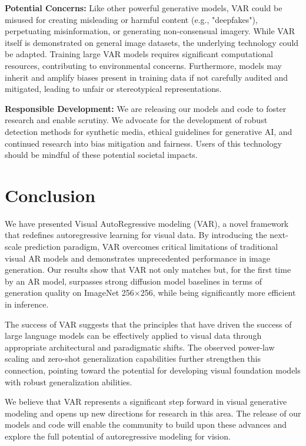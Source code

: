 \documentclass{article}
\begin{document}
\textbf{Potential Concerns:} Like other powerful generative models, VAR could be misused for creating misleading or harmful content (e.g., "deepfakes"), perpetuating misinformation, or generating non-consensual imagery. While VAR itself is demonstrated on general image datasets, the underlying technology could be adapted. Training large VAR models requires significant computational resources, contributing to environmental concerns. Furthermore, models may inherit and amplify biases present in training data if not carefully audited and mitigated, leading to unfair or stereotypical representations.

\textbf{Responsible Development:} We are releasing our models and code to foster research and enable scrutiny. We advocate for the development of robust detection methods for synthetic media, ethical guidelines for generative AI, and continued research into bias mitigation and fairness. Users of this technology should be mindful of these potential societal impacts.

\section{Conclusion}
\label{sec:conclusion}

We have presented Visual AutoRegressive modeling (VAR), a novel framework that redefines autoregressive learning for visual data. By introducing the next-scale prediction paradigm, VAR overcomes critical limitations of traditional visual AR models and demonstrates unprecedented performance in image generation. Our results show that VAR not only matches but, for the first time by an AR model, surpasses strong diffusion model baselines in terms of generation quality on ImageNet 256$\times$256, while being significantly more efficient in inference.

The success of VAR suggests that the principles that have driven the success of large language models can be effectively applied to visual data through appropriate architectural and paradigmatic shifts. The observed power-law scaling and zero-shot generalization capabilities further strengthen this connection, pointing toward the potential for developing visual foundation models with robust generalization abilities.

We believe that VAR represents a significant step forward in visual generative modeling and opens up new directions for research in this area. The release of our models and code will enable the community to build upon these advances and explore the full potential of autoregressive modeling for vision.
\end{document}
